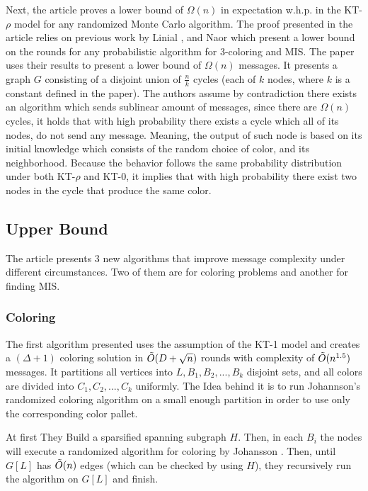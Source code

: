 \documentclass[11pt]{article}
\begin{document}
Next, the article proves a lower bound of $\Omega(n)$ in expectation w.h.p. in the KT-$\rho$ model for any randomized Monte Carlo algorithm.
The proof presented in the article relies on previous work by Linial \cite{Linial}, and Naor \cite{Naor} which present a lower bound on the rounds for any probabilistic algorithm for 3-coloring and MIS. The paper uses their results to present a lower bound of $\Omega(n)$ messages. It presents a graph $G$ consisting of a disjoint union of $\frac{n}{k}$ cycles (each of $k$ nodes, where $k$ is a constant defined in the paper). The authors assume by contradiction there exists an algorithm which sends sublinear amount of messages, since there are $\Omega(n)$ cycles, it holds that with high probability there exists a cycle which all of its nodes, do not send any message. Meaning, the output of such node is based on its initial knowledge which consists of the random choice of color, and its neighborhood. Because the behavior follows the same probability distribution under both KT-$\rho$ and KT-$0$, it implies that with high probability there exist two nodes in the cycle that produce the same color.

\subsection*{Upper Bound}
The article presents 3 new algorithms that improve message complexity under different circumstances. Two of them are for coloring problems and another for finding MIS.

\subsubsection*{Coloring}

The first algorithm presented uses the assumption of the KT-1 model and creates a $(\Delta+1)$ coloring solution in ${\Tilde{O}}(D+\sqrt{n})$ rounds with complexity of ${\Tilde{O}}(n^{1.5})$ messages. It partitions all vertices into $L, B_1, B_2, ..., B_k$ disjoint sets, and all colors are divided into $C_1, C_2, ..., C_k$ uniformly. The Idea behind it is to run Johannson's \cite{Johansson} randomized coloring algorithm on a small enough partition in order to use only the corresponding color pallet. 

At first They Build a sparsified spanning subgraph $H$. Then, in each $B_i$ the nodes will execute a randomized algorithm for coloring by Johansson \cite{Johansson}. Then, until $G[L]$ has $\Tilde{O}(n)$ edges (which can be checked by using $H$), they recursively run the algorithm on $G[L]$ and finish.
\end{document}
